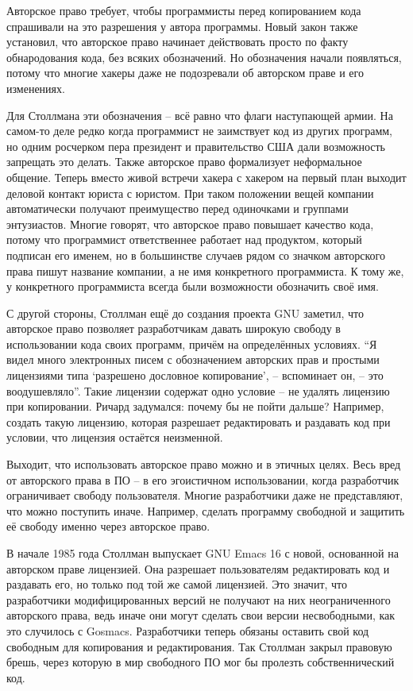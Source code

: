Авторское право требует, чтобы программисты перед копированием кода спрашивали на это разрешения у автора программы. Новый закон также установил, что авторское право начинает действовать просто по факту обнародования кода, без всяких обозначений. Но обозначения начали появляться, потому что многие хакеры даже не подозревали об авторском праве и его изменениях.

Для Столлмана эти обозначения -- всё равно что флаги наступающей армии. На самом-то деле редко когда программист не заимствует код из других программ, но одним росчерком пера президент и правительство США дали возможность запрещать это делать. Также авторское право формализует неформальное общение. Теперь вместо живой встречи хакера с хакером на первый план выходит деловой контакт юриста с юристом. При таком положении вещей компании автоматически получают преимущество перед одиночками и группами энтузиастов. Многие говорят, что авторское право повышает качество кода, потому что программист ответственнее работает над продуктом, который подписан его именем, но в большинстве случаев рядом со значком авторского права пишут название компании, а не имя конкретного программиста. К тому же, у конкретного программиста всегда были возможности обозначить своё имя.

С другой стороны, Столлман ещё до создания проекта GNU заметил, что авторское право позволяет разработчикам давать широкую свободу в использовании кода своих программ, причём на определённых условиях. ``Я видел много электронных писем с обозначением авторских прав и простыми лицензиями типа `разрешено дословное копирование', -- вспоминает он, -- это воодушевляло''. Такие лицензии содержат одно условие -- не удалять лицензию при копировании. Ричард задумался: почему бы не пойти дальше? Например, создать такую лицензию, которая разрешает редактировать и раздавать код при условии, что лицензия остаётся неизменной.

Выходит, что использовать авторское право можно и в этичных целях. Весь вред от авторского права в ПО -- в его эгоистичном использовании, когда разработчик ограничивает свободу пользователя. Многие разработчики даже не представляют, что можно поступить иначе. Например, сделать программу свободной и защитить её свободу именно через авторское право.

В начале 1985 года Столлман выпускает GNU Emacs 16 с новой, основанной на авторском праве лицензией. Она разрешает пользователям редактировать код и раздавать его, но только под той же самой лицензией. Это значит,  что разработчики модифицированных версий не получают на них неограниченного авторского права, ведь иначе они могут сделать свои версии несвободными, как это случилось с Gosmacs. Разработчики теперь обязаны оставить свой код свободным для копирования и редактирования. Так Столлман закрыл правовую брешь, через которую в мир свободного ПО мог бы пролезть собственнический код.

